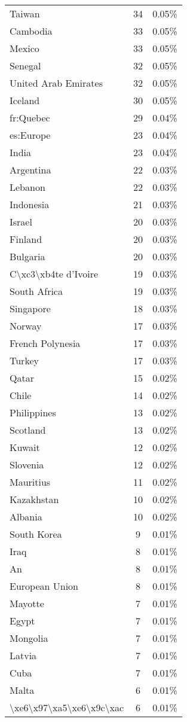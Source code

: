 \documentclass[11pt]{article}
\begin{document}
\begin{center}
\begin{longtable}{|l|c|r|}
Taiwan& 34& 0.05\%\\
Cambodia& 33& 0.05\%\\
Mexico& 33& 0.05\%\\
Senegal& 32& 0.05\%\\
United Arab Emirates& 32& 0.05\%\\
Iceland& 30& 0.05\%\\
fr:Quebec& 29& 0.04\%\\
es:Europe& 23& 0.04\%\\
India& 23& 0.04\%\\
Argentina& 22& 0.03\%\\
Lebanon& 22& 0.03\%\\
Indonesia& 21& 0.03\%\\
Israel& 20& 0.03\%\\
Finland& 20& 0.03\%\\
Bulgaria& 20& 0.03\%\\
C\textbackslash xc3\textbackslash xb4te d'Ivoire& 19& 0.03\%\\
South Africa& 19& 0.03\%\\
Singapore& 18& 0.03\%\\
Norway& 17& 0.03\%\\
French Polynesia& 17& 0.03\%\\
Turkey& 17& 0.03\%\\
Qatar& 15& 0.02\%\\
Chile& 14& 0.02\%\\
Philippines& 13& 0.02\%\\
Scotland& 13& 0.02\%\\
Kuwait& 12& 0.02\%\\
Slovenia& 12& 0.02\%\\
Mauritius& 11& 0.02\%\\
Kazakhstan& 10& 0.02\%\\
Albania& 10& 0.02\%\\
South Korea& 9& 0.01\%\\
Iraq& 8& 0.01\%\\
An& 8& 0.01\%\\
European Union& 8& 0.01\%\\
Mayotte& 7& 0.01\%\\
Egypt& 7& 0.01\%\\
Mongolia& 7& 0.01\%\\
Latvia& 7& 0.01\%\\
Cuba& 7& 0.01\%\\
Malta& 6& 0.01\%\\
\textbackslash xe6\textbackslash x97\textbackslash xa5\textbackslash xe6\textbackslash x9c\textbackslash xac& 6& 0.01\%\\

\end{longtable}
\end{center}
\end{document}
